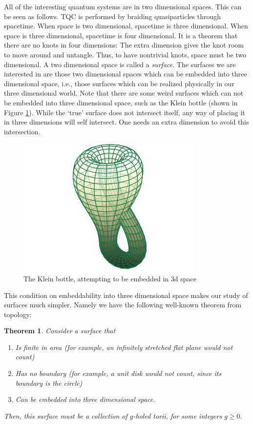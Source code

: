 \documentclass{article}
\newtheorem{theorem}{Theorem}[section]
\theoremstyle{definition}
\numberwithin{figure}{section}
\begin{document}
All of the interesting quantum systems are in two dimensional spaces. This can be seen as follows. TQC is performed by braiding quasiparticles through spacetime. When space is two dimensional, spacetime is three dimensional. When space is three dimensional, spacetime is four dimensional. It is a theorem that there are no knots in four dimensions: The extra dimension gives the knot room to move around and untangle. Thus, to have nontrivial knots, space must be two dimensional. A two dimensional space is called a \textit{surface}. The surfaces we are interested in are those two dimensional spaces which can be embedded into three dimensional space, i.e., those surfaces which can be realized physically in our three dimensional world. Note that there are some weird surfaces which can not be embedded into three dimensional space, such as the Klein bottle (shown in Figure  \ref{fig:klein-bottle}). While the `true' surface does not intersect itself, any way of placing it in three dimensions will self intersect. One needs an extra dimension to avoid this intersection.

\begin{figure}
\begin{center}
\includegraphics[scale=0.25]{klein-bottle}
\caption{The Klein bottle, attempting to be embedded in 3d space}
\label{fig:klein-bottle}
\end{center}
\end{figure}

This condition on embeddability into three dimensional space makes our study of surfaces much simpler. Namely we have the following well-known theorem from topology:

\begin{theorem} Consider a surface that

\begin{enumerate}
\item Is finite in area (for example, an infinitely stretched flat plane would not count)
\item Has no boundary (for example, a unit disk would not count, since its boundary is the circle)
\item  Can be embedded into three dimensional space.
\end{enumerate}

Then, this surface must be a collection of $g$-holed torii, for some integers $g\geq 0$.
\end{theorem}
\end{document}
